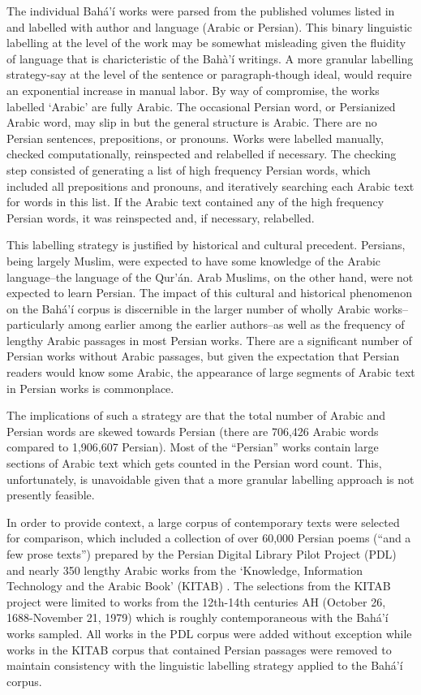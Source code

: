 \documentclass[12pt, oneside]{report}
\begin{document}
\par
The individual Bah\'{a}'\'{i} works were parsed from the published volumes listed in  and labelled with author and language (Arabic or Persian). This binary linguistic labelling at the level of the work may be somewhat misleading given the fluidity of language that is charicteristic of the Bah\`{a}'\'{i} writings. A more granular labelling strategy-say at the level of the sentence or paragraph-though ideal, would require an exponential increase in manual labor. By way of compromise, the works labelled `Arabic' are fully Arabic. The occasional Persian word, or Persianized Arabic word, may slip in but the general structure is Arabic. There are no Persian sentences, prepositions, or pronouns. Works were labelled manually, checked computationally, reinspected and relabelled if necessary. The checking step consisted of generating a list of high frequency Persian words, which included all prepositions and pronouns, and iteratively searching each Arabic text for words in this list. If the Arabic text contained any of the high frequency Persian words, it was reinspected and, if necessary, relabelled.
\par
This labelling strategy is justified by historical and cultural precedent. Persians, being largely Muslim, were expected to have some knowledge of the Arabic language–the language of the Qur'\'{a}n. Arab Muslims, on the other hand, were not expected to learn Persian. The impact of this cultural and historical phenomenon on the Bah\'{a}'\'{i} corpus is discernible in the larger number of wholly Arabic works–particularly among earlier among the earlier authors–as well as the frequency of lengthy Arabic passages in most Persian works. There are a significant number of Persian works without Arabic passages, but given the expectation that Persian readers would know some Arabic, the appearance of large segments of Arabic text in Persian works is commonplace.
\par
The implications of such a strategy are that the total number of Arabic and Persian words are skewed towards Persian (there are 706,426 Arabic words compared to 1,906,607 Persian). Most of the ``Persian'' works contain large sections of Arabic text which gets counted in the Persian word count. This, unfortunately, is unavoidable given that a more granular labelling approach is not presently feasible.
\par
In order to provide context, a large corpus of contemporary texts were selected for comparison, which included a collection of over 60,000 Persian poems (``and a few prose texts'') prepared by the Persian Digital Library Pilot Project (PDL) \cite{noauthor_persian_nodate} and nearly 350 lengthy Arabic works from the `Knowledge, Information Technology and the Arabic Book' (KITAB) \cite{maxim_romanov_openiti:_2019}. The selections from the KITAB project were limited to works from the 12th-14th centuries AH (October 26, 1688-November 21, 1979) which is roughly contemporaneous with the Bah\'{a}'\'{i} works sampled. All works in the PDL corpus were added without exception while works in the KITAB corpus that contained Persian passages were removed to maintain consistency with the linguistic labelling strategy applied to the Bah\'{a}'\'{i} corpus.
\end{document}
